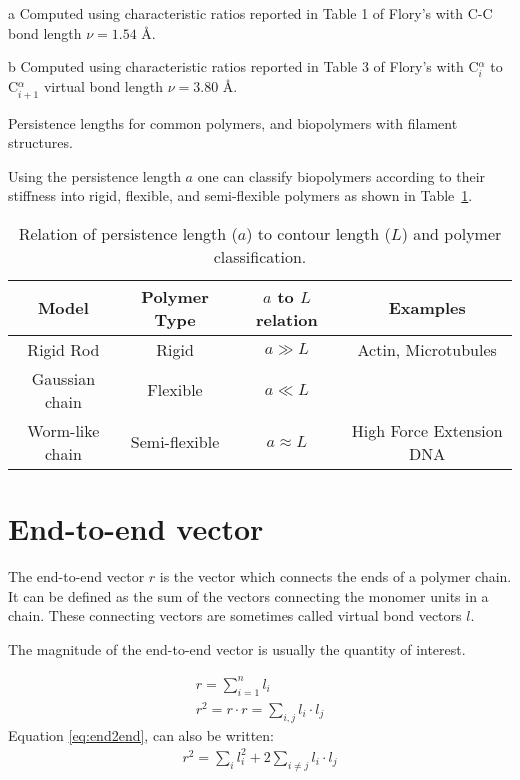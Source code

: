 \begin{table}[htbp]
\begin{center}
\begin{threeparttable}
\begin{tablenotes}
\item [a] Computed using  characteristic ratios reported in Table 1
  of Flory's \cite{flory1969} with C-C bond length $\nu = 1.54$ \AA.
\item [b] Computed using  characteristic ratios reported in Table 3
  of Flory's \cite{flory1969} with C$^{\alpha}_{i}$ to C$^{\alpha}_{i+1}$ virtual
  bond length $\nu = 3.80$ \AA.
\end{tablenotes}
\end{threeparttable}
\caption{Persistence lengths for common polymers, and biopolymers with
  filament structures.}
\label{tab:perval}
\end{center}
\end{table}

Using  the  persistence  length  $a$  one  can  classify  biopolymers
according to  their stiffness into rigid,  flexible, and semi-flexible
polymers as shown in Table~\ref{tab:pers}.
\begin{table}[H]
\begin{center}  
\begin{tabular}{c|c|c|c}
\hline
Model           & Polymer Type & $a$ to $L$ relation & Examples\\ \hline
Rigid Rod       & Rigid          &  $a \gg L$     &  Actin, Microtubules\\
Gaussian chain  & Flexible       &  $a \ll L$     &  \\
Worm-like chain & Semi-flexible  &  $a \approx L$ &  High Force Extension DNA\\
\hline
\end{tabular}
\label{tab:pers}
\caption{Relation of persistence length ($a$) to contour length ($L$)
  and polymer classification.}
\end{center}
\end{table}


\section{End-to-end vector}
The end-to-end vector  $r$ is the vector which connects  the ends of a
polymer chain.  It can be defined as the sum of the vectors connecting
the monomer units  in a chain. These connecting  vectors are sometimes
called virtual bond vectors $l$.

The magnitude of the end-to-end vector is usually the quantity of interest.

\begin{gather}
\label{eq:end2end}
r = \sum_{i=1}^{n} l_{i}\\
r^2 = r \cdot r = \sum_{i,j}l_{i} \cdot l_{j}
\end{gather}
Equation \ref{eq:end2end}, can also be written:
\begin{gather}
r^2 = \sum_{i}l_{i}^{2} + 2 \sum_{i\neq j} l_{i} \cdot l_{j}
\end{gather}  

